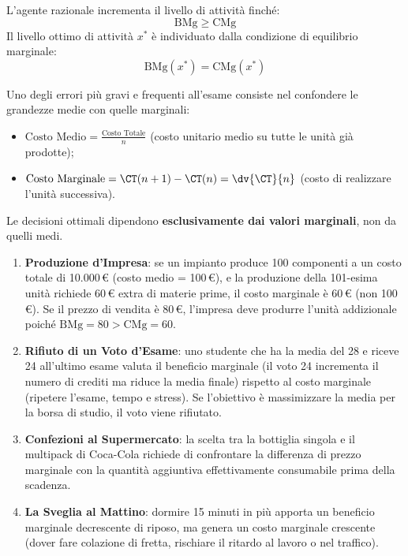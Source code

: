 \begin{metodo}
L'agente razionale incrementa il livello di attività finché:
\begin{equation}
    \mathrm{BMg} \ge \mathrm{CMg}
\end{equation}
Il livello ottimo di attività $x^*$ è individuato dalla condizione di equilibrio marginale:
\begin{equation}
    \mathrm{BMg}(x^*) = \mathrm{CMg}(x^*)
\end{equation}
\end{metodo}

\begin{esame}
Uno degli errori più gravi e frequenti all'esame consiste nel confondere le grandezze medie con quelle marginali:
\begin{itemize}
    \item $\text{Costo Medio} = \frac{\text{Costo Totale}}{n}$ (costo unitario medio su tutte le unità già prodotte);
    \item $\text{Costo Marginale} = \CT(n+1) - \CT(n) = \dv{\CT}{n}$ (costo di realizzare l'unità successiva).
\end{itemize}
Le decisioni ottimali dipendono \textbf{esclusivamente dai valori marginali}, non da quelli medi.
\end{esame}

\begin{esempio}
\begin{enumerate}
    \item \textbf{Produzione d'Impresa}: se un impianto produce 100 componenti a un costo totale di 10.000\,\euro{} (costo medio = 100\,\euro{}), e la produzione della 101-esima unità richiede 60\,\euro{} extra di materie prime, il costo marginale è 60\,\euro{} (non 100\,\euro{}). Se il prezzo di vendita è 80\,\euro{}, l'impresa deve produrre l'unità addizionale poiché $\mathrm{BMg} = 80 > \mathrm{CMg} = 60$.
    \item \textbf{Rifiuto di un Voto d'Esame}: uno studente che ha la media del 28 e riceve 24 all'ultimo esame valuta il beneficio marginale (il voto 24 incrementa il numero di crediti ma riduce la media finale) rispetto al costo marginale (ripetere l'esame, tempo e stress). Se l'obiettivo è massimizzare la media per la borsa di studio, il voto viene rifiutato.
    \item \textbf{Confezioni al Supermercato}: la scelta tra la bottiglia singola e il multipack di Coca-Cola richiede di confrontare la differenza di prezzo marginale con la quantità aggiuntiva effettivamente consumabile prima della scadenza.
    \item \textbf{La Sveglia al Mattino}: dormire 15 minuti in più apporta un beneficio marginale decrescente di riposo, ma genera un costo marginale crescente (dover fare colazione di fretta, rischiare il ritardo al lavoro o nel traffico).
\end{enumerate}
\end{esempio}

